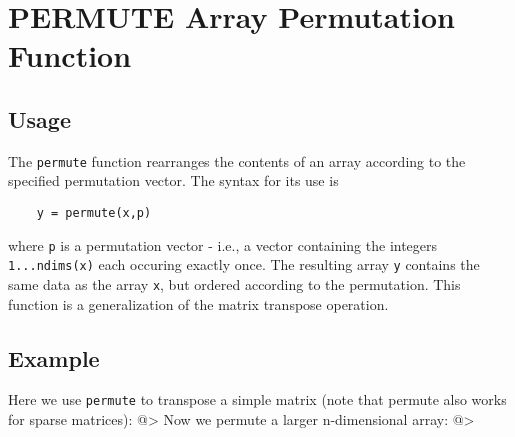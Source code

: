 \section{PERMUTE Array Permutation Function}

\subsection{Usage}

The \verb|permute| function rearranges the contents of an array according
to the specified permutation vector.  The syntax for its use is
\begin{verbatim}
    y = permute(x,p)
\end{verbatim}
where \verb|p| is a permutation vector - i.e., a vector containing the 
integers \verb|1...ndims(x)| each occuring exactly once.  The resulting
array \verb|y| contains the same data as the array \verb|x|, but ordered
according to the permutation.  This function is a generalization of
the matrix transpose operation.
\subsection{Example}

Here we use \verb|permute| to transpose a simple matrix (note that permute
also works for sparse matrices):
@>
Now we permute a larger n-dimensional array:
@>
